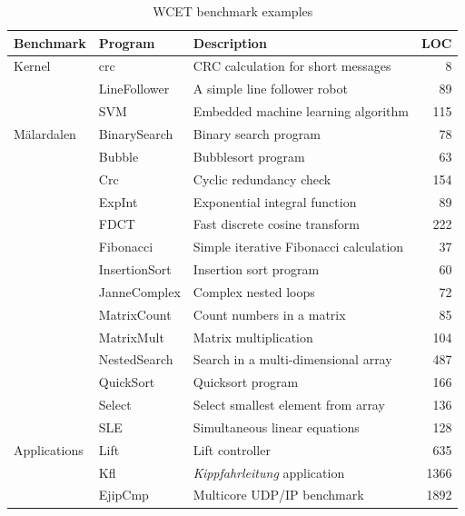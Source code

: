 \begin{table}[t]
\begin{center}
\begin{small}
\begin{tabular}{lllr}
    \toprule
    Benchmark   & Program             & Description                         & LOC \\
    \midrule
    Kernel      & crc          & CRC calculation for short messages  & 8 \\
                & LineFollower & A simple line follower robot        & 89 \\
                & SVM          & Embedded machine learning algorithm & 115 \\
    \midrule
    M\"alardalen & BinarySearch&  Binary search program              & 78 \\
                & Bubble       &  Bubblesort program                 & 63 \\
                & Crc          &  Cyclic redundancy check            & 154 \\
                & ExpInt       &  Exponential integral function      & 89 \\
                & FDCT         &  Fast discrete cosine transform     & 222 \\
                & Fibonacci    &  Simple iterative Fibonacci calculation & 37 \\
                & InsertionSort&  Insertion sort program             & 60 \\
                & JanneComplex &  Complex nested loops               & 72 \\
                & MatrixCount  &  Count numbers in a matrix          & 85 \\
                & MatrixMult   &  Matrix multiplication              & 104 \\
                & NestedSearch &  Search in a multi-dimensional array& 487 \\
                & QuickSort    &  Quicksort program                  & 166  \\
                & Select       &  Select smallest element from array & 136  \\
                & SLE          &  Simultaneous linear equations      & 128  \\
    \midrule
    Applications& Lift         & Lift controller                     & 635 \\
                & Kfl          & \emph{Kippfahrleitung} application  & 1366 \\
                & EjipCmp      & Multicore UDP/IP benchmark          & 1892 \\
    \bottomrule
\end{tabular}
\end{small}
\end{center}
    \caption{WCET benchmark examples}
    \label{tab:wcet:examples}
\end{table}


